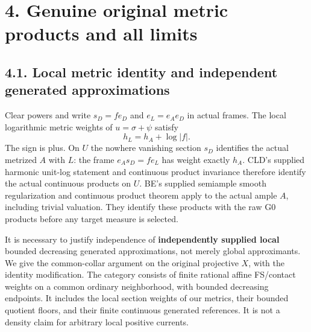 \documentclass[
  10pt,
]{article}
\begin{document}
\section{4. Genuine original metric products and all
limits}\label{genuine-original-metric-products-and-all-limits}

\subsection{4.1. Local metric identity and independent generated
approximations}\label{local-metric-identity-and-independent-generated-approximations}

Clear powers and write \(s_D=f e_D\) and \(e_L=e_Ae_D\) in actual
frames. The local logarithmic metric weights of \(u=\sigma+\psi\)
satisfy \[h_L=h_A+\log|f|.\tag{19}\] The sign is plus. On \(U\) the
nowhere vanishing section \(s_D\) identifies the actual metrized \(A\)
with \(L\): the frame \(e_As_D=f e_L\) has weight exactly \(h_A\). CLD's
supplied harmonic unit-log statement and continuous product invariance
therefore identify the actual continuous products on \(U\). BE's
supplied semiample smooth regularization and continuous product theorem
apply to the actual ample \(A\), including trivial valuation. They
identify these products with the raw G0 products before any target
measure is selected.

It is necessary to justify independence of \textbf{independently
supplied local} bounded decreasing generated approximations, not merely
global approximants. We give the common-collar argument on the original
projective \(X\), with the identity modification. The category consists
of finite rational affine FS/contact weights on a common ordinary
neighborhood, with bounded decreasing endpoints. It includes the local
section weights of our metrics, their bounded quotient floors, and their
finite continuous generated references. It is not a density claim for
arbitrary local positive currents.
\end{document}
